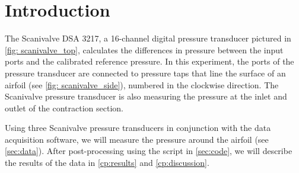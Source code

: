 \chapter{Introduction}
\label{cp:introduction}
The Scanivalve DSA 3217, a 16-channel digital pressure transducer pictured in \autoref{fig: scanivalve_top}, calculates the differences in pressure between the input ports and the calibrated reference pressure. In this experiment, the ports of the pressure transducer are connected to pressure taps that line the surface of an airfoil (see \autoref{fig: scanivalve_side}), numbered in the clockwise direction. The Scanivalve pressure transducer is also measuring the pressure at the inlet and outlet of the contraction section.

Using three Scanivalve pressure transducers in conjunction with the data acquisition software, we will measure the pressure around the airfoil (see \autoref{sec:data}). After post-processing using the script in \autoref{sec:code}, we will describe the results of the data in \autoref{cp:results} and \autoref{cp:discussion}.